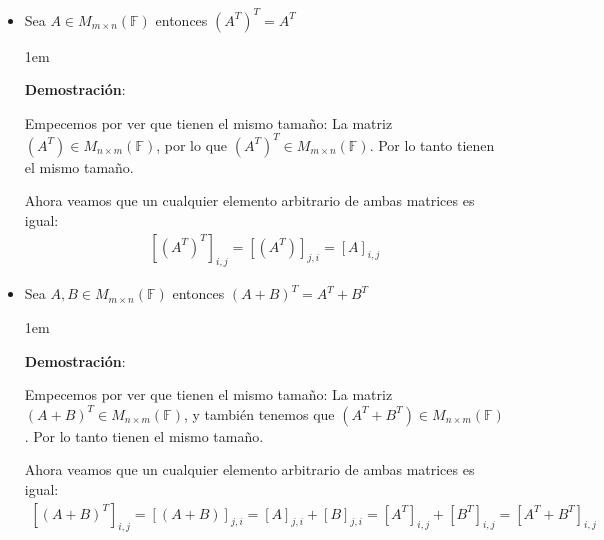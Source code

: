 \documentclass[12pt]{report}                                    %
\newenvironment{SmallIndentation}[1][0.75em]                    %
    {\begin{adjustwidth}{#1}{}\begin{footnotesize}}                 %
    {\end{footnotesize}\end{adjustwidth}}                           %
\begin{document}
                \begin{itemize}

                    \item Sea $A\in M_{m \times n}(\mathbb{F})$ entonces $(A^T)^T = A^T$
                        \begin{SmallIndentation}[1em]
                            \textbf{Demostración}:

                            Empecemos por ver que tienen el mismo tamaño:
                            La matriz $(A^T) \in M_{n \times m}(\mathbb{F})$, por lo que 
                            $(A^T)^T \in M_{m \times n}(\mathbb{F})$.
                            Por lo tanto tienen el mismo tamaño.

                            Ahora veamos que un cualquier elemento arbitrario de ambas matrices es igual:
                            \begin{equation*}
                            \begin{split}
                                [(A^T)^T]_{i, j}    
                                    = [(A^T)]_{j, i}               
                                = [A]_{i, j}
                            \end{split}
                            \end{equation*}

                        \end{SmallIndentation}

                    \item Sea $A,B \in M_{m \times n}(\mathbb{F})$ entonces 
                        $(A+B)^T = A^T + B^T$

                        \begin{SmallIndentation}[1em]
                            \textbf{Demostración}:

                            Empecemos por ver que tienen el mismo tamaño:
                            La matriz $(A+B)^T \in M_{n \times m}(\mathbb{F})$, y también tenemos que
                            $(A^T+B^T) \in M_{n \times m}(\mathbb{F})$. Por lo tanto tienen el mismo
                            tamaño.

                            Ahora veamos que un cualquier elemento arbitrario de ambas matrices es igual:
                            \begin{equation*}
                            \begin{split}
                                [(A+B)^T]_{i, j}    
                                    = [(A+B)]_{j, i}               
                                    = [A]_{j, i} + [B]_{j, i}      
                                    = [A^T]_{i, j} + [B^T]_{i, j}
                                = [A^T + B^T]_{i, j}
                            \end{split}
                            \end{equation*}


\end{SmallIndentation}
\end{itemize}
\end{document}

